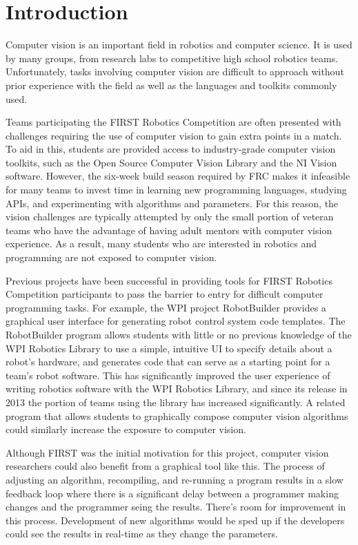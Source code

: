 \documentclass[12pt]{article}
\begin{document}

\tableofcontents
\pagebreak


\section{Introduction}
Computer vision is an important field in robotics and computer science.  It is used by many groups, from research labs to competitive high school robotics teams.  Unfortunately, tasks involving computer vision are difficult to approach without prior experience with the field as well as the languages and toolkits commonly used.
\par
Teams participating the FIRST Robotics Competition are often presented with challenges requiring the use of computer vision to gain extra points in a match.  To aid in this, students are provided access to industry-grade computer vision toolkits, such as the Open Source Computer Vision Library and the NI Vision software.  However, the six-week build season required by FRC makes it infeasible for many teams to invest time in learning new programming languages, studying APIs, and experimenting with algorithms and parameters.  For this reason, the vision challenges are typically attempted by only the small portion of veteran teams who have the advantage of having adult mentors with computer vision experience.  As a result, many students who are interested in robotics and programming are not exposed to computer vision.
\par
Previous projects have been successful in providing tools for FIRST Robotics Competition participants to pass the barrier to entry for difficult computer programming tasks.  For example, the WPI project RobotBuilder provides a graphical user interface for generating robot control system code templates.  The RobotBuilder program allows students with little or no previous knowledge of the WPI Robotics Library to use a simple, intuitive UI to specify details about a robot's hardware, and generates code that can serve as a starting point for a team's robot software.  This has significantly improved the user experience of writing robotics software with the WPI Robotics Library, and since its release in 2013 the portion of teams using the library has increased significantly.  A related program that allows students to graphically compose computer vision algorithms could similarly increase the exposure to computer vision.
\par
Although FIRST was the initial motivation for this project, computer vision researchers could also benefit from a graphical tool like this.  The process of adjusting an algorithm, recompiling, and re-running a program results in a slow feedback loop where there is a significant delay between a programmer making changes and the programmer seing the results.  There's room for improvement in this process.  Development of new algorithms would be sped up if the developers could see the results in real-time as they change the parameters.
\end{document}
